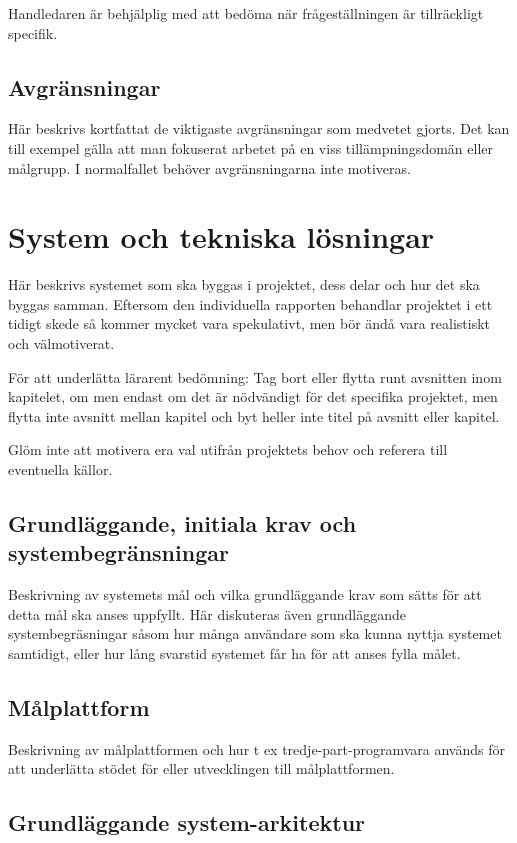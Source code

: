 \documentclass[a4paper,12pt,oneside,final]{extbook}
\begin{document}
Handledaren är behjälplig med att bedöma när frågeställningen är
tillräckligt specifik.


\section{Avgränsningar}

Här beskrivs kortfattat de viktigaste avgränsningar som medvetet
gjorts. Det kan till exempel gälla att man fokuserat arbetet på en
viss tillämpningsdomän eller målgrupp. I normalfallet behöver
avgränsningarna inte motiveras.


\chapter{System och tekniska lösningar}

Här beskrivs systemet som ska byggas i projektet, dess delar och hur
det ska byggas samman. Eftersom den individuella rapporten behandlar
projektet i ett tidigt skede så kommer mycket vara spekulativt, men
bör ändå vara realistiskt och välmotiverat.

För att underlätta lärarent bedömning: Tag bort eller flytta runt
avsnitten inom kapitelet, om men endast om det är nödvändigt för det
specifika projektet, men flytta inte avsnitt mellan kapitel och byt
heller inte titel på avsnitt eller kapitel.

Glöm inte att motivera era val utifrån projektets behov och referera
till eventuella källor.

\section{Grundläggande, initiala krav och systembegränsningar}

Beskrivning av systemets mål och vilka grundläggande krav som sätts
för att detta mål ska anses uppfyllt. Här diskuteras även
grundläggande systembegräsningar såsom hur många användare som ska
kunna nyttja systemet samtidigt, eller hur lång svarstid systemet får
ha för att anses fylla målet.

\section{Målplattform}

Beskrivning av målplattformen och hur t ex tredje-part-programvara
används för att underlätta stödet för eller utvecklingen till
målplattformen.

\section{Grundläggande system-arkitektur}
\end{document}
